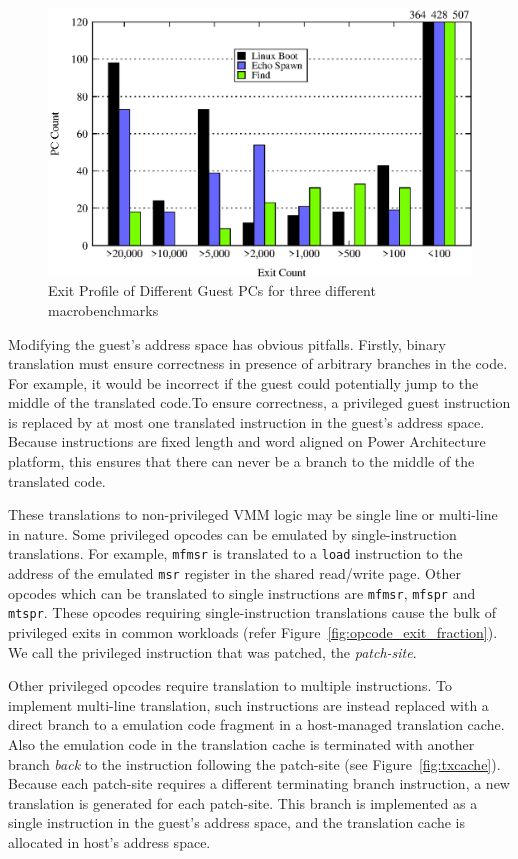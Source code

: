 \begin{figure}[!htb]
\centering

\includegraphics[scale=0.5]{pc_count.eps}
\caption{\label{fig:pc_profile}Exit Profile of Different Guest PCs for three different macrobenchmarks}
\end{figure}

Modifying the guest's address space has obvious pitfalls. Firstly, binary translation must ensure correctness in presence of arbitrary branches in the code. For example, it would be incorrect if the guest could potentially jump to the middle of the translated code.To ensure correctness, a privileged guest instruction is replaced by at most one translated instruction in the guest's address space. Because instructions are fixed length and word aligned on Power Architecture platform, this ensures that there can never be a branch to the middle of the translated code.

These translations to non-privileged VMM logic may be single line  or multi-line in nature. Some privileged opcodes can be emulated by single-instruction translations. For example, {\tt mfmsr} is translated to a {\tt load} instruction to the address of the emulated {\tt msr} register in the shared read/write page. Other opcodes which can be translated to single instructions are {\tt mfmsr}, {\tt mfspr} and {\tt mtspr}. These opcodes requiring single-instruction translations cause the bulk of privileged exits in common workloads (refer Figure~\ref {fig:opcode_exit_fraction}). We call the privileged instruction that was patched, the {\em patch-site}.

Other privileged opcodes require translation to multiple instructions. To implement multi-line translation, such instructions are instead replaced with a direct branch to a emulation code fragment in a host-managed translation cache. Also the emulation code in the translation cache is terminated with another branch {\em back} to the instruction following the patch-site (see Figure~\ref{fig:txcache}). Because each patch-site requires a different terminating branch instruction, a new translation is generated for each patch-site. This branch is  implemented as a single instruction in the guest’s address space, and the translation cache is allocated in host’s address space.

